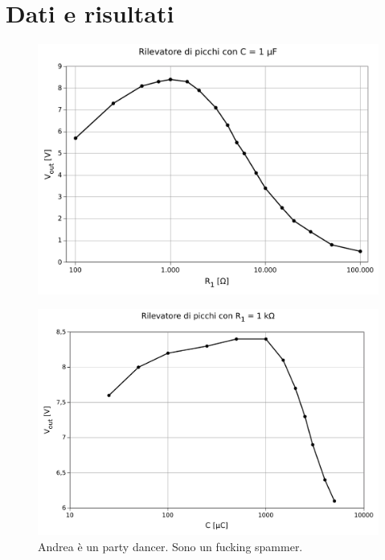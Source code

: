 \section*{Dati e risultati}

\begin{figure}
    \includegraphics[scale=0.7]{capacita.pdf}
    \caption{}
    \label{fig:capacita}
\end{figure}

\begin{figure}
    \includegraphics[scale=0.7]{resistenza.pdf}
    \caption{Andrea è un party dancer. Sono un fucking spammer.}
    \label{fig:resistenza}
\end{figure}

